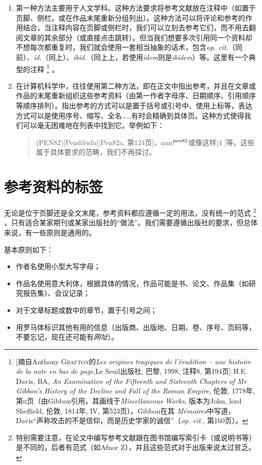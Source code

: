 \begin{enumerate}
    \item 第一种方法主要用于人文学科。这种方法要求将参考文献放在注释中（如置于页脚、侧栏，或在作品末尾重新分组列出）。这种方法可以将评论和参考的作用结合，当注释内容在页脚或侧栏时，我们可以立刻去参考它们，而不用去翻阅文章的其余部分（或直接点击跳转）。但当我们想要多次引用同一个资料却不想每次都重复时，我们就会使用一套相当抽象的话术，包含\emph{op. cit.}（同前）、\emph{id.}（同上）、\emph{ibid.}（同上上，若使用\emph{idem}则是\emph{ibidem}）等。这里有一个典型的注释
        \footnote{[摘自Anthony \textsc{Grafton}的\emph{Les origines tragiques de l’érudition – une histoire de la note en bas de page},Le Seuil出版社, 巴黎, 1998, 注释8, 第194页] H.E. Davis, BA, \emph{An Examination of the Fifteenth and Sixteenth Chapters of Mr Gibbon’s History of the Decline and Fall of the Roman Empire}, 伦敦, 1778年, 第\textsc{ii}页（由Gibbon引用，其画线于\emph{Miscellaneous Works}, 版本为John, lord Sheffield, 伦敦, 1814年, IV, 第523页）。Gibbon在其\emph{ Mémoires}中写道，Davis“声称攻击的不是信仰，而是历史学家的诚信”（\emph{op. cit.}, 第160页）。}
    。
    \item 在计算机科学中，往往使用第二种方法，即在正文中指出参考，并且在文章或作品的末尾重新组织这些参考资料（由第一作者字母序、日期顺序、引用顺序等顺序排列）。指出参考的方式可以是置于括号或引号中、使用上标等，表达方式可以是使用序号、缩写、全名……有时会精确到具体页。这种方式使得我们可以毫无困难地在列表中找到它。举例如下：
    
    \begin{quote}
        (PEN82)[Pendibidu][Pen82a, 第124页]，mm$^{\rm pen82}$或像这样[4%
        ]等。这些属于具体要求的范畴，我们不再探讨。
    \end{quote}
\end{enumerate}

\section{参考资料的标签}

无论是位于页脚还是全文末尾，参考资料都应遵循一定的用法，没有统一的范式
    \footnote{特别需要注意，在论文中编写参考文献跟在图书馆编写索引卡（或说明书等）是不同的，后者有范式（如Afnor Z），并且这些范式对于出版来说太过贫乏。}
，只有适合某家期刊或某家出版社的“做法”。我们需要遵循出版社的要求，但总体来说，有一些原则是通用的。

\begin{mdframed}
    基本原则如下：
    \begin{itemize}
        \item 作者名使用小型大写字母；
        \item 作品名使用意大利体，根据具体的情况，作品可能是书、论文、作品集（如研究报告集）、会议记录；
        \item 对于文章标题或数中的章节，置于引号之间；
        \item 用罗马体标识其他有用的信息（出版商、出版地、日期、卷、序号、页码等，不要忘记，现在还可能有\emph{网址}）。
    \end{itemize}
\end{mdframed}

